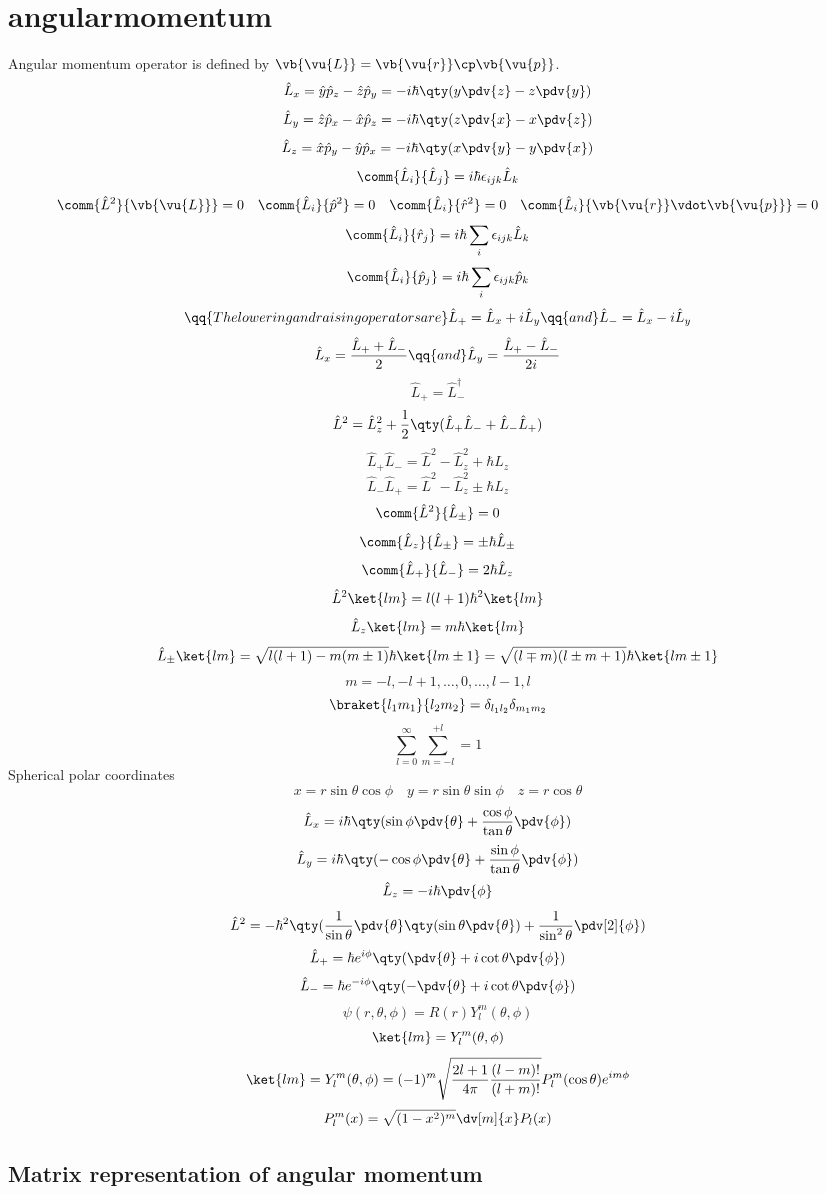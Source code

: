 \section*{angularmomentum}
Angular momentum operator is defined by $\vb{\vu{L}}=\vb{\vu{r}}\cp\vb{\vu{p}}$.
\[\hat{L}_x=\hat{y}\hat{p}_z-\hat{z}\hat{p}_y=-i\hbar\qty(y\pdv{z}-z\pdv{y})\]
\[\hat{L}_y=\hat{z}\hat{p}_x-\hat{x}\hat{p}_z=-i\hbar\qty(z\pdv{x}-x\pdv{z})\]
\[\hat{L}_z=\hat{x}\hat{p}_y-\hat{y}\hat{p}_x=-i\hbar\qty(x\pdv{y}-y\pdv{x})\]
\[\comm{\hat{L}_i}{\hat{L}_j}=i\hbar\epsilon_{ijk}\hat{L}_k\]
\[\comm{\hat{L}^2}{\vb{\vu{L}}}=0\quad\comm{\hat{L}_i}{\hat{p}^2}=0\quad\comm{\hat{L}_i}{\hat{r}^2}=0\quad\comm{\hat{L}_i}{\vb{\vu{r}}\vdot\vb{\vu{p}}}=0\]
\[\comm{\hat{L}_i}{\hat{r}_j}=i\hbar\sum_{i}\epsilon_{ijk}\hat{L}_k\]
\[\comm{\hat{L}_i}{\hat{p}_j}=i\hbar\sum_{i}\epsilon_{ijk}\hat{p}_k\]
\[\qq{The lowering and raising operators are } \hat{L}_{+}=\hat{L}_x+i\hat{L}_y \qq{and} \hat{L}_{-}=\hat{L}_x-i\hat{L}_y\]
\[\hat{L}_x=\frac{\hat{L}_++\hat{L}_-}{2} \qq{and} \hat{L}_y=\frac{\hat{L}_+-\hat{L}_-}{2i}\]
\[\hat{L}_+=\hat{L}_-^{\dag}\]
\[\hat{L}^2=\hat{L}_z^2+\frac{1}{2}\qty(\hat{L}_+\hat{L}_-+\hat{L}_-\hat{L}_+)\]
\[\hat{L}_+\hat{L}_-=\hat{L}^2-\hat{L}_z^2+\hbar\hat{L}_z\]
\[\hat{L}_-\hat{L}_+=\hat{L}^2-\hat{L}_z^2\pm\hbar\hat{L}_z\]
\[\comm{\hat{L}^2}{\hat{L}_{\pm}}=0\]
\[\comm{\hat{L}_z}{\hat{L}_{\pm}}=\pm\hbar\hat{L}_{\pm}\]
\[\comm{\hat{L}_+}{\hat{L}_-}=2\hbar\hat{L}_z\]
\[\hat{L}^2\ket{lm}=l(l+1)\hbar^2\ket{lm}\]
\[\hat{L}_z\ket{lm}=m\hbar\ket{lm}\]
\[\hat{L}_{\pm}\ket{lm}=\sqrt{l(l+1)-m(m\pm1)}\hbar\ket{lm\pm1}=\sqrt{(l\mp m)(l\pm m+1)}\hbar\ket{lm\pm1}\]
\[m=-l,-l+1,\ldots,0,\ldots,l-1,l\]
\[\braket{l_1m_1}{l_2m_2}=\delta_{l_1l_2}\delta_{m_1m_2}\]
\[\sum_{l=0}^{\infty}\sum_{m=-l}^{+l}=1\]
Spherical polar coordinates
\[x=r\sin\theta\cos\phi\quad y=r\sin\theta\sin\phi\quad z=r\cos\theta\]
\[\hat{L}_x=i\hbar\qty(\sin\phi\pdv{\theta}+\frac{\cos\phi}{\tan\theta}\pdv{\phi})\]
\[\hat{L}_y=i\hbar\qty(-\cos\phi\pdv{\theta}+\frac{\sin\phi}{\tan\theta}\pdv{\phi})\]
\[\hat{L}_z=-i\hbar\pdv{\phi}\]
\[\hat{L}^2=-\hbar^2\qty(\frac{1}{\sin\theta}\pdv{\theta}\qty(\sin\theta\pdv{\theta})+\frac{1}{\sin^2\theta}\pdv[2]{\phi})\]
\[\hat{L}_+=\hbar e^{i\phi}\qty(\pdv{\theta}+i\cot\theta\pdv{\phi})\]
\[\hat{L}_-=\hbar e^{-i\phi}\qty(-\pdv{\theta}+i\cot\theta\pdv{\phi})\]
\[\psi(r,\theta,\phi)=R(r)Y_l^m(\theta,\phi)\]
\[\ket{lm}=Y_l^m(\theta,\phi)\]
\[\ket{lm}=Y_l^m(\theta,\phi)=(-1)^m\sqrt{\frac{2l+1}{4\pi}\frac{(l-m)!}{(l+m)!}}P_l^m(\cos\theta)e^{im\phi}\]
\[P_l^m(x)=\sqrt{(1-x^2)^m}\dv[m]{x}P_l(x)\]
\subsection*{Matrix representation of angular momentum}

